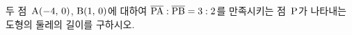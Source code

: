 두 점~$\mathrm{A}(-4,\,0)$, $\mathrm{B}(1,\,0)$에 대하여 $\overline{\mathrm{PA}}:\overline{\mathrm{PB}}=3:2$를 만족시키는 점~$\mathrm{P}$가 나타내는 도형의 둘레의 길이를 구하시오.

